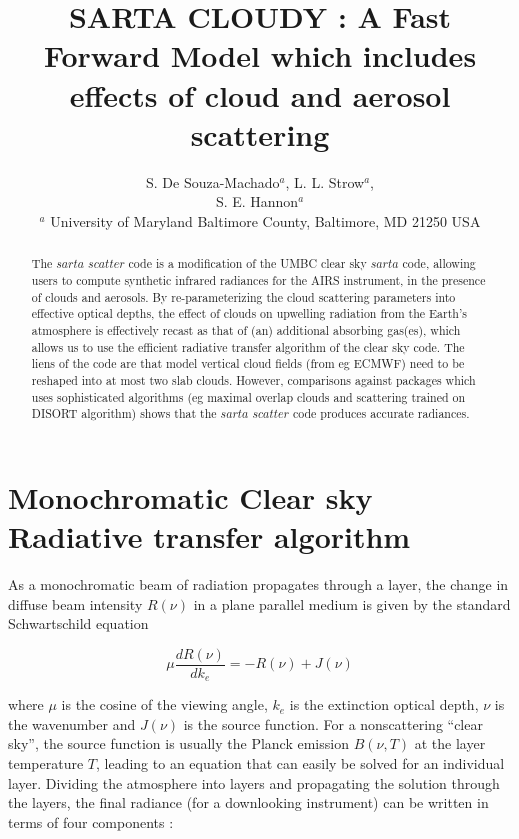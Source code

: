 \documentclass[11pt]{article}
\title{SARTA CLOUDY : A Fast Forward Model which includes effects of cloud and aerosol scattering}
\author{S. De Souza-Machado$^{a}$, L. L. Strow$^{a}$,\\
                S. E. Hannon$^{a}$ \\
     $^{a}$ University of Maryland Baltimore County, Baltimore, MD 21250 USA}
\begin{document}
\maketitle

\begin{abstract}

The $sarta$ $scatter$ code is a modification of the UMBC clear sky $sarta$ code, allowing users to compute 
synthetic infrared radiances for the AIRS instrument, in the presence of clouds and aerosols. By re-parameterizing the
cloud scattering parameters into effective optical depths, the effect of clouds on upwelling radiation from
the Earth's atmosphere is effectively recast as that of (an) additional absorbing gas(es), which allows us to use 
the efficient radiative transfer algorithm of the clear sky code. The liens of the code are that model vertical cloud
fields (from eg ECMWF) need to be reshaped into at most two slab clouds. However, comparisons against packages 
which uses sophisticated algorithms (eg maximal overlap clouds and scattering trained on DISORT algorithm) shows that
the $sarta$ $scatter$ code produces accurate radiances.

\end{abstract}

\section{Monochromatic Clear sky Radiative transfer algorithm}

As a monochromatic beam of radiation propagates through a layer, the change in diffuse beam
intensity $R(\nu)$ in a plane parallel medium is given by the standard
Schwartschild equation \cite{lio:80,goo:89,edw:92}

\begin{equation}
\mu \frac{dR(\nu)}{dk_{e}} = -R(\nu) + J(\nu)
\label{eqn:sch}
\end{equation}

where $\mu$ is the cosine of the viewing angle, $k_{e}$ is the extinction
optical depth, $\nu$ is the wavenumber and $J(\nu)$ is the source function. For
a nonscattering ``clear sky'', the source function is usually the Planck
emission $B(\nu,T)$ at the layer temperature $T$, leading to an equation that
can easily be solved for an individual layer. Dividing the atmosphere into
layers and propagating the solution through the layers, the final radiance
(for a downlooking instrument) can be written in terms of four components :
\end{document}
